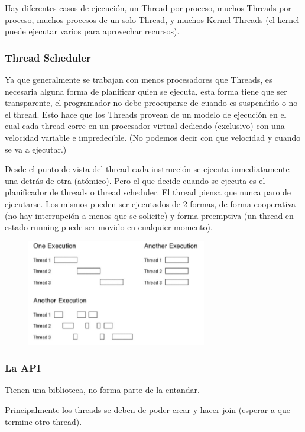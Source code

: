 \documentclass[titlepage,a4paper]{article}
\begin{document}
Hay diferentes casos de ejecución, un Thread por proceso, muchos Threads por proceso, muchos procesos de un solo Thread, y muchos Kernel Threads (el kernel puede ejecutar varios para aprovechar recursos).

\subsubsection*{Thread Scheduler}
Ya que generalmente se trabajan con menos procesadores que Threads, es necesaria alguna forma de planificar quien se ejecuta, esta forma tiene que ser transparente, el programador no debe preocuparse de cuando es suspendido o no el thread. Esto hace que los Threads provean de un modelo de ejecución en el cual cada thread corre en un procesador virtual dedicado (exclusivo) con una velocidad variable e impredecible. (No podemos decir con que velocidad y cuando se va a ejecutar.)

Desde el punto de vista del thread cada instrucción se ejecuta inmediatamente una detrás de otra (atómico). Pero el que decide cuando se ejecuta es el planificador de threads o thread scheduler. El thread piensa que nunca paro de ejecutarse. Los mismos pueden ser ejecutados de 2 formas, de forma cooperativa (no hay interrupción a menos que se solicite) y forma preemptiva (un thread en estado running puede ser movido en cualquier momento).

\begin{figure}[!htb]
    \centering
    \includegraphics[width=0.7\textwidth]{ImagenesApunte/threads_execution.jpg}
\end{figure}

\subsubsection*{La API}
Tienen una biblioteca, no forma parte de la entandar.

Principalmente los threads se deben de poder crear y hacer join (esperar a que termine otro thread).
\end{document}
